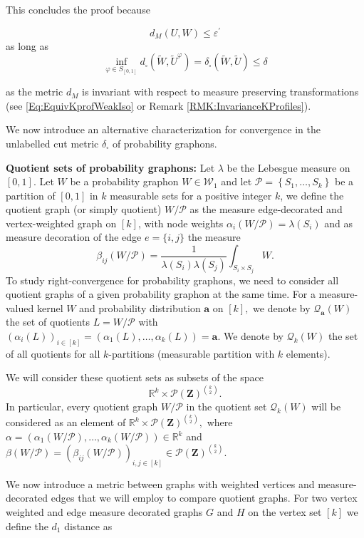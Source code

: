 \documentclass[11pt]{article}
\def\R{\mathbb{R}}
\newcommand{\cP}{{\mathcal P}}  %
\newcommand{\Space}{\mathbf{Z}}
\newcommand{\Graphon}{\mathcal{W}_1}
\newcommand{\InvRelabel}{S_{[0,1]}}
\begin{document}
This concludes the proof because 

$$
d_M(U,W)\leq \varepsilon^{\prime}%
$$
as long as 
$$
\inf_{\varphi \in \InvRelabel}d_{\square}(\widetilde W,\widetilde U^{\varphi})=\delta_{\square}(\widetilde W,\widetilde U)\leq \delta
$$

as the metric  $d_M$ is invariant with respect to measure preserving transformations (see \eqref{Eq:EquivKprofWeakIso} or Remark \ref{RMK:InvarianceKProfiles}).
\endproof

We now introduce an alternative characterization for convergence in the unlabelled cut metric $\delta_{\square}$ of probability graphons.


\textbf{Quotient sets of probability graphons:} Let $\lambda$ be the Lebesgue measure on $[0,1].$ Let $W$ be a probability graphon $W\in\Graphon$ and let $\mathcal{P}=\left\{S_1, \ldots, S_k\right\}$ be a partition of $[0,1]$ in $k$ measurable sets for a positive integer $k$, we define the quotient graph (or simply quotient) $W / \mathcal{P}$ as the measure edge-decorated and vertex-weighted graph on $[k]$, with node weights $\alpha_i(W / \mathcal{P})=\lambda\left(S_i\right)$ and as measure decoration of the edge $e=\{i,j\}$ the measure
$$
\beta_{i j}(W / \mathcal{P})=\frac{1}{\lambda\left(S_i\right) \lambda\left(S_j\right)} \int_{S_i \times S_j} W .
$$
To study right-convergence for probability graphons, we need to consider all quotient graphs of a given probability graphon at the same time. For a measure-valued kernel $W$ and probability distribution $\mathbf{a}$ on $[k],$ we denote by $\mathcal{Q}_{\mathbf{a}}(W)$ the set of quotients $L=W / \mathcal{P}$ with $(\alpha_i(L))_{i\in [k]}=(\alpha_1(L),\ldots,\alpha_k(L))=\mathbf{a}.$ We denote by $\mathcal{Q}_k(W)$ the set of all quotients for all $k$-partitions (measurable partition with $k$ elements).

We will consider these quotient sets as subsets of the space $$\R^k\times\cP(\Space)^{{k} \choose {2}}.$$
In particular, every quotient graph $W / \mathcal{P}$ in the quotient set $\mathcal{Q}_k(W)$ will be considered as an element of $\R^k\times\cP(\Space)^{{k} \choose {2}},$ where $\alpha=(\alpha_1(W / \mathcal{P}),\ldots,\alpha_k(W / \mathcal{P}))\in \R^k$ and $\beta(W / \mathcal{P})=(\beta_{i j}(W / \mathcal{P}))_{i,j\in [k]}\in \cP(\Space)^{{k} \choose {2}}.$

We now introduce a metric between graphs with weighted vertices and measure-decorated edges that we will employ to compare quotient graphs. 
For two vertex weighted and edge measure decorated graphs $G$ and $H$ on the vertex set $[k]$ we define the $d_1$ distance as 
\end{document}
